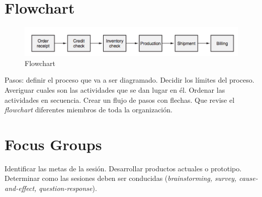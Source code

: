 \documentclass[oneside]{book}
\begin{document}
\section{Flowchart}

\begin{figure}[H]
	\centering
	\includegraphics[width=120mm]{imagenes/Flowchart.png}
	\caption{Flowchart}
	\label{fig:Flowchart}
\end{figure}

Pasos: definir el proceso que va a ser diagramado. Decidir los límites del proceso. Averiguar cuales son las actividades que se dan lugar en él. Ordenar las actividades en secuencia. Crear un flujo de pasos con flechas. Que revise el \textit{flowchart} diferentes miembros de toda la organización.

\section{Focus Groups}

Identificar las metas de la sesión. Desarrollar productos actuales o prototipo. Determinar como las sesiones deben ser conducidas (\textit{brainstorming, survey, cause-and-effect, question-response}).
\end{document}
